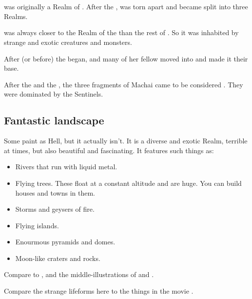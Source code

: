 \section{\Machai}
\index{\Machai}
\Machai was originally a Realm of \Miith. 
After the , \Machai was torn apart and became split into three Realms. 

\Machai was always closer to the Realm of the \xss than the rest of \Miith. 
So it was inhabited by strange and exotic creatures and monsters. 

After (or before) the  began, \Tiamat and many of her fellow \dragons moved into \Machai and made it their base. 

After the \secondbanewar and the \Shrouding, the three fragments of Machai came to be considered . 
They were dominated by the Sentinels. 









\subsection{Fantastic landscape}
Some  paint \Machai{} as Hell, but it actually isn't. 
It is a diverse and exotic Realm, terrible at times, but also beautiful and fascinating. 
It features such things as:

\begin{itemize}
  \item Rivers that run with liquid metal.
  \item Flying trees. These float at a constant altitude and are huge. You can build houses and towns in them. 
  \item Storms and geysers of fire. 
  \item Flying islands.
  \item Enourmous pyramids and domes. 
  \item Moon-like craters and rocks.
\end{itemize}

Compare to , and the middle-illustrations of  and . 

Compare the strange lifeforms here to the things in the movie \cite{Movie:Evolution}. 

